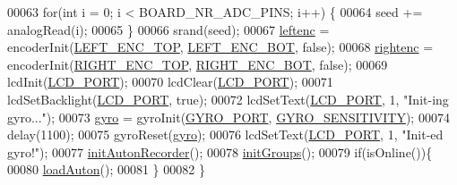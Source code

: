 \begin{DoxyCode}
00063     \textcolor{keywordflow}{for}(\textcolor{keywordtype}{int} i = 0; i < BOARD\_NR\_ADC\_PINS; i++) \{
00064         seed += analogRead(i);
00065     \}
00066     srand(seed);
00067     \hyperlink{sensors_8c_a48ead63071a2b65b87a166928a5a5c08}{leftenc} = encoderInit(\hyperlink{sensors_8h_ad0ae0aded49835e75c52bc506585f5a6}{LEFT\_ENC\_TOP}, \hyperlink{sensors_8h_ae913e0b80ef027d0a619e59a3d2ffb85}{LEFT\_ENC\_BOT}, \textcolor{keyword}{false});
00068     \hyperlink{sensors_8c_a8c853ba918673c4878ab6935c54969e4}{rightenc} = encoderInit(\hyperlink{sensors_8h_a07c1c0ceab9fee6088955b2b2706e515}{RIGHT\_ENC\_TOP}, \hyperlink{sensors_8h_a76290ef36d8c093e1d380e26d1d01f6a}{RIGHT\_ENC\_BOT}, \textcolor{keyword}{false});
00069     lcdInit(\hyperlink{lcdmsg_8h_abcf42bd88b3c36193f301ca25b033875}{LCD\_PORT});
00070     lcdClear(\hyperlink{lcdmsg_8h_abcf42bd88b3c36193f301ca25b033875}{LCD\_PORT});
00071     lcdSetBacklight(\hyperlink{lcdmsg_8h_abcf42bd88b3c36193f301ca25b033875}{LCD\_PORT}, \textcolor{keyword}{true});
00072     lcdSetText(\hyperlink{lcdmsg_8h_abcf42bd88b3c36193f301ca25b033875}{LCD\_PORT}, 1, \textcolor{stringliteral}{"Init-ing gyro..."});
00073     \hyperlink{sensors_8c_ad2d059cd4baeedd5fbead13085953eed}{gyro} = gyroInit(\hyperlink{sensors_8h_a51d281e7676749d34aab3f8ba6fab960}{GYRO\_PORT}, \hyperlink{sensors_8h_a6e58fcea626847c9734cdc19eb93a6c5}{GYRO\_SENSITIVITY});
00074     delay(1100);
00075     gyroReset(\hyperlink{sensors_8c_ad2d059cd4baeedd5fbead13085953eed}{gyro});
00076     lcdSetText(\hyperlink{lcdmsg_8h_abcf42bd88b3c36193f301ca25b033875}{LCD\_PORT}, 1, \textcolor{stringliteral}{"Init-ed gyro!"});
00077     \hyperlink{autonrecorder_8c_acd89c8b2c622ae271c5d63d7fb8fa5f6}{initAutonRecorder}();
00078     \hyperlink{lcddiag_8c_ad290df3e273598f9f10fe34c257e4084}{initGroups}();
00079     \textcolor{keywordflow}{if}(isOnline())\{
00080         \hyperlink{autonrecorder_8c_af6d130061f44459f9b3c629123e78f6e}{loadAuton}();
00081     \}
00082 \}
\end{DoxyCode}
